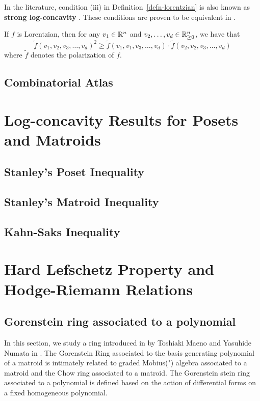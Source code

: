 \documentclass{puthesis-UG}
\begin{document}
In the literature, condition (iii) in Definition~\ref{defn-lorentzian} is also known as \textbf{strong log-concavity} \cite{strongly-log-concave}. These conditions are proven to be equivalent in \cite{lorentzian-polynomials}. 

\begin{prop}
	If $f$ is Lorentzian, then for any $v_1 \in \mathbb{R}^n$ and $v_2, \ldots, v_d \in \mathbb{R}_{\geq 0}^n$, we have that 
	\[
		\widetilde{f}(v_1, v_2, v_3, \ldots, v_d)^2 \geq \widetilde{f}(v_1, v_1, v_3, \ldots, v_d) \cdot \widetilde{f}(v_2, v_2, v_3, \ldots, v_d)
	\]
	where $\widetilde{f}$ denotes the polarization of $f$. 
\end{prop}

\section{Combinatorial Atlas}

\chapter{Log-concavity Results for Posets and Matroids}

\section{Stanley's Poset Inequality}

\section{Stanley's Matroid Inequality} 

\section{Kahn-Saks Inequality}


\chapter{Hard Lefschetz Property and Hodge-Riemann Relations}

\section{Gorenstein ring associated to a polynomial}

In this section, we study a ring introduced in by Toshiaki Maeno and Yasuhide Numata in \cite{MN-gorenstein}. The Gorenstein Ring associated to the basis generating polynomial of a matroid is intimately related to graded Mobius(") algebra associated to a matroid and the Chow ring associated to a matroid. The Gorenstein stein ring associated to a polynomial is defined based on the action of differential forms on a fixed homogeneous polynomial.
\end{document}
